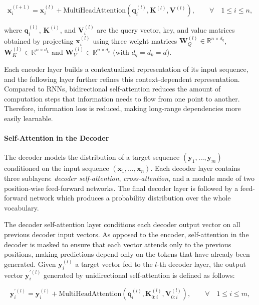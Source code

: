 \begin{equation}
    \bm{x}^{(l+1)}_i = \bm{x}^{(l)}_i + \textrm{MultiHeadAttention}\left(\bm{q}^{(l)}_i, \bm{K}^{(l)}, \bm{V}^{(l)}\right), \qquad \forall \quad 1 \leq i \leq n,
\end{equation}

\noindent where $\bm{q}^{(l)}_i$, $\bm{K}^{(l)}$, and $\bm{V}^{(l)}_i$ are the query vector, key, and value matrices obtained by projecting $\bm{x}^{(l)}_i$ using three weight matrices $\bm{W}^{(l)}_Q \in \mathbb{R}^{n \times d_q}$, $\bm{W}^{(l)}_K \in \mathbb{R}^{n \times d_k}$ and $\bm{W}^{(l)}_V \in \mathbb{R}^{n \times d_v}$ (with $d_q = d_k = d$).

Each encoder layer builds a contextualized representation of its input sequence, and the following layer further refines this context-dependent representation. Compared to \acp{RNN}, bidirectional self-attention reduces the amount of computation steps that information needs to flow from one point to another. Therefore, information loss is reduced, making long-range dependencies more easily learnable. 

\paragraph{Self-Attention in the Decoder} The decoder models the distribution of a target sequence $(\bm{y}_1, \ldots, \bm{y}_m)$ conditioned on the input sequence $(\bm{x}_1, \ldots, \bm{x}_n)$. Each decoder layer contains three sublayers: \textit{decoder self-attention}, \textit{cross-attention}, and a module made of two position-wise feed-forward networks. The final decoder layer is followed by a feed-forward network which produces a probability distribution over the whole vocabulary. 

The decoder self-attention layer conditions each decoder output vector on all previous decoder input vectors. As opposed to the encoder, self-attention in the decoder is masked to ensure that each vector attends only to the previous positions, making predictions depend only on the tokens that have already been generated. Given $\bm{y}^{(l)}_i$ a target vector fed to the $l$-th decoder layer, the output vector $\bm{y}^{\prime(l)}_i$ generated by unidirectional self-attention is defined as follows:

\begin{equation}
    \bm{y}^{\prime(l)}_i = \bm{y}^{(l)}_i + \textrm{MultiHeadAttention}\left(\bm{q}^{(l)}_i, \bm{K}^{(l)}_{0:i}, \bm{V}^{(l)}_{0:i}\right), \qquad \forall \quad 1 \leq i \leq m,
\end{equation}

